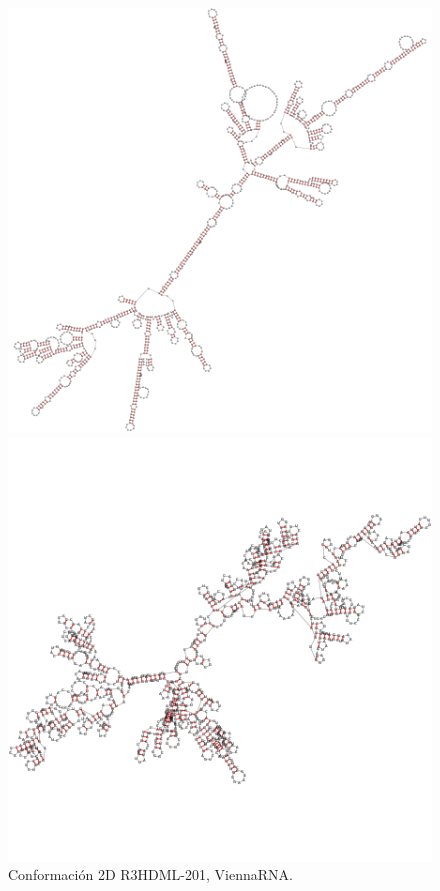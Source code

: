\documentclass[a4paper,11pt,titlepage]{article}
\theoremstyle{definition}
\begin{document}
\begin{figure}[H]
    \centering
    \begin{minipage}[c]{0.31\textwidth}
        \centering
        \includegraphics[width=\textwidth]{images/R3HDML-201-db_vrna.png}
        \caption{Conformación 2D R3HDML-201, ViennaRNA.}
        \label{fig:R3HDML-201-vrna}
    \end{minipage}
    \hfill
    \begin{minipage}[c]{0.31\textwidth}
        \centering
        \includegraphics[width=\textwidth]{images/R3HDML-201-db_rndc.png}

\end{minipage}
\end{figure}
\end{document}
